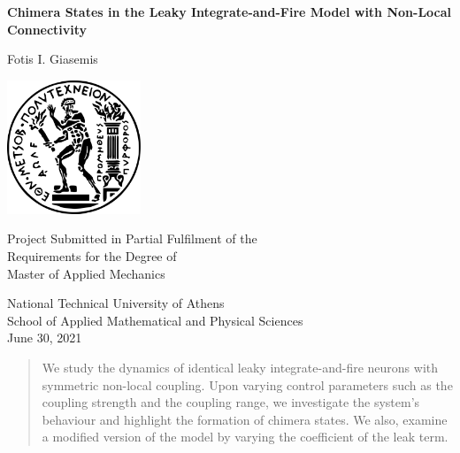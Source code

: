 \documentclass[a4paper,12pt]{article}
\begin{document}
\begin{titlepage}
\begin{center}
\vspace*{1cm}
 
\Huge
\textbf{Chimera States in the Leaky Integrate-and-Fire Model with Non-Local Connectivity}
 
\vspace{0.5cm}
\LARGE
 
\vspace{1.5cm}

Fotis I. Giasemis
 
\vfill

\includegraphics[width=0.3\textwidth]{mets.png}

\vfill
 
Project Submitted in Partial Fulfilment of the\\ Requirements for the Degree of\\ Master of Applied Mechanics
 
\vspace{.8cm}
 

 

National Technical University of Athens\\ 
School of Applied Mathematical and Physical Sciences\\
June 30, 2021
 
\end{center}
\end{titlepage}

\tableofcontents
\pagebreak

\hline

\begin{abstract}
We study the dynamics of identical leaky integrate-and-fire neurons with symmetric non-local coupling. Upon varying control parameters such as the coupling strength and the coupling range, we investigate the system's behaviour and highlight the formation of chimera states. We also, examine a modified version of the model by varying the coefficient of the leak term.
\end{abstract}
\hline
\end{document}
